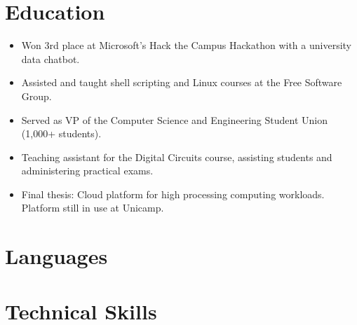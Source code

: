 \documentclass[10pt, a4paper, roman]{moderncv} %
\begin{document}
\section{Education}

{
    \begin{itemize}
        \item Won 3rd place at Microsoft's Hack the Campus Hackathon with a university data chatbot.
        \item Assisted and taught shell scripting and Linux courses at the Free Software Group.
        \item Served as VP of the Computer Science and Engineering Student Union (1,000+ students).
        \item Teaching assistant for the Digital Circuits course, assisting students and administering practical exams.
        \item Final thesis: Cloud platform for high processing computing workloads. Platform still in use at Unicamp.
    \end{itemize} 
}

\section{Languages}


\section{Technical Skills}

\end{document}
